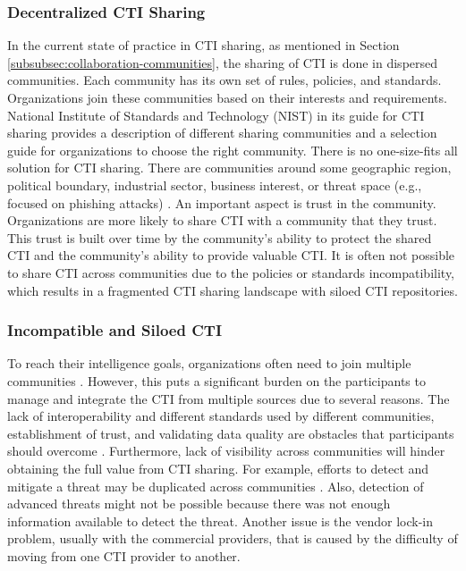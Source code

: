 \subsubsection{Decentralized CTI Sharing}
In the current state of practice in CTI sharing, as mentioned in Section \ref{subsubsec:collaboration-communities}, the sharing of CTI is done in dispersed communities. Each community has its own set of rules, policies, and standards.
Organizations join these communities based on their interests and requirements.  National Institute of Standards and Technology (NIST) in its guide for CTI sharing \cite{johnson_guide_2016} provides a description of different sharing communities and a selection guide for organizations to choose the right community. There is no one-size-fits all solution for CTI sharing. There are communities around some geographic region, political boundary, industrial sector, business interest, or threat space (e.g., focused on phishing attacks) \cite{johnson_guide_2016}.
An important aspect is trust in the community. Organizations are more likely to share CTI with a community that they trust. This trust is built over time by the community's ability to protect the shared CTI and the community's ability to provide valuable CTI. It is often not possible to share CTI across communities due to the policies or standards incompatibility, which results in a fragmented CTI sharing landscape with siloed CTI repositories. 


\subsubsection{Incompatible and Siloed CTI}
To reach their intelligence goals, organizations often need to join multiple communities \cite{johnson_guide_2016}. However, this puts a significant burden on the participants to manage and integrate the CTI from multiple sources due to several reasons. The lack of interoperability and different standards used by different communities, establishment of trust, and validating data quality are obstacles that participants should overcome \cite{zibak_cyber_2019}. 
Furthermore, lack of visibility across communities will hinder obtaining the full value from CTI sharing. For example, efforts to detect and mitigate a threat may be duplicated across communities \cite{zibak_cyber_2019}. Also, detection of advanced threats might not be possible because there was not enough information available to detect the threat. Another issue is the vendor lock-in problem, usually with the commercial providers, that is caused by the difficulty of moving from one CTI provider to another.

